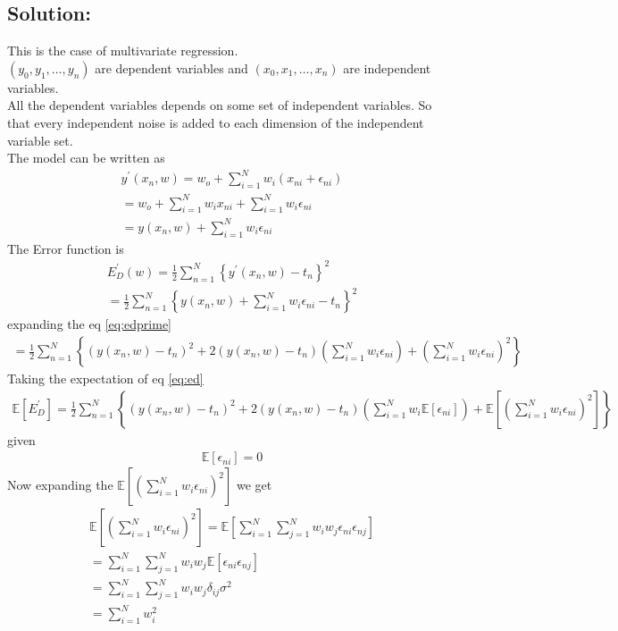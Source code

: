 \documentclass[12pt]{article}
\begin{document}
\subsection*{Solution:}
This is the case of multivariate regression.\\
$(y_0,y_1,\ldots,y_n)$ are dependent variables and $(x_0,x_1,\ldots,x_n)$ are independent variables.\\
All the dependent variables depends on some set of independent variables. So that every independent noise is added to each dimension of the independent variable set.\\
The model can be written as 
\begin{align}
y^{\prime}(x_n,w) = w_o + \sum_{i=1}^{N} w_i (x_{ni}+\epsilon_{ni})\\
= w_o + \sum_{i=1}^{N} w_ix_{ni} + \sum_{i=1}^{N} w_i\epsilon_{ni}\\
= y(x_n,w) + \sum_{i=1}^{N} w_i\epsilon_{ni}\label{eq:yprime}
\end{align}
The Error function is
\begin{align}
E_D^{\prime}(w) = \frac{1}{2} \sum_{n=1}^{N}\left\lbrace y^{\prime}(x_n,w)-t_n\right\rbrace^2\\
= \frac{1}{2} \sum_{n=1}^{N} \left\lbrace y(x_n,w) + \sum_{i=1}^{N} w_i\epsilon_{ni}- t_n \right\rbrace^2 \label{eq:edprime}
\end{align}
expanding the eq \eqref{eq:edprime}
\begin{align}
= \frac{1}{2} \sum_{n=1}^{N}\left\lbrace \left(y(x_n,w) - t_n \right)^2 + 2 \left(y(x_n,w) - t_n \right) \left(\sum_{i=1}^{N} w_i\epsilon_{ni}\right) + \left(\sum_{i=1}^{N} w_i\epsilon_{ni}\right)^2 \right\rbrace \label{eq:ed}
\end{align}
Taking the expectation of eq \eqref{eq:ed}
\begin{align}
\mathbb{E}[E_D^{\prime}] = \frac{1}{2} \sum_{n=1}^{N}\left\lbrace \left(y(x_n,w) - t_n \right)^2 + 2 \left(y(x_n,w) - t_n \right) \left(\sum_{i=1}^{N} w_i \mathbb{E}\left[\epsilon_{ni}\right]\right) + \mathbb{E}\left[\left(\sum_{i=1}^{N} w_i\epsilon_{ni}\right)^2\right] \right\rbrace\label{eq:edexp}
\end{align}
given 
\begin{align}
\mathbb{E}[\epsilon_{ni}] = 0\label{eq:mean}
\end{align}
Now expanding the $\mathbb{E}\left[\left(\sum_{i=1}^{N} w_i\epsilon_{ni}\right)^2\right]$ we get
\begin{align}
\mathbb{E}\left[\left(\sum_{i=1}^{N} w_i\epsilon_{ni}\right)^2\right] = \mathbb{E}\left[\sum_{i=1}^{N} \sum_{j=1}^{N} w_i w_j \epsilon_{ni} \epsilon_{nj} \right]\\
= \sum_{i=1}^{N} \sum_{j=1}^{N} w_i w_j \mathbb{E}\left[\epsilon_{ni} \epsilon_{nj} \right]\\
= \sum_{i=1}^{N} \sum_{j=1}^{N} w_i w_j \delta_{ij} \sigma^2\\
= \sum_{i=1}^{N} w_i^2 \label{eq:reg}
\end{align}
\end{document}
